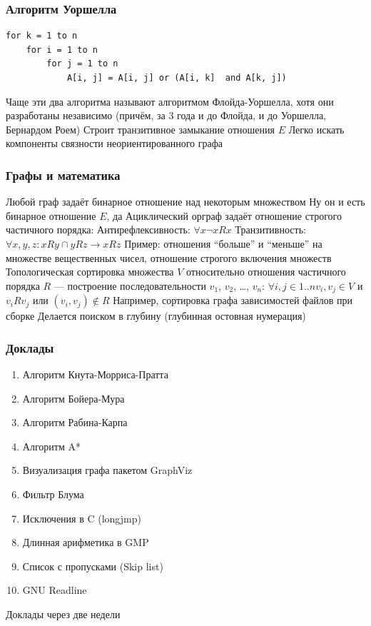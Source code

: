 \documentclass{../../slides-style}
\begin{document}
    \begin{frame}[fragile]
        \frametitle{Алгоритм Уоршелла}
        \begin{footnotesize}
            \begin{verbatim}
for k = 1 to n
    for i = 1 to n
        for j = 1 to n
            A[i, j] = A[i, j] or (A[i, k]  and A[k, j])
            \end{verbatim}
        \end{footnotesize}
        \begin{outline}
            \1 Чаще эти два алгоритма называют алгоритмом Флойда-Уоршелла, хотя они разработаны независимо (причём, за 3 года и до Флойда, и до Уоршелла, Бернардом Роем)
            \1 Строит транзитивное замыкание отношения $E$
                \2 Легко искать компоненты связности неориентированного графа
        \end{outline}
    \end{frame}

    \begin{frame}
        \frametitle{Графы и математика}
        \begin{outline}
            \1 Любой граф задаёт бинарное отношение над некоторым множеством
                \2 Ну он и есть бинарное отношение $E$, да
            \1 Ациклический орграф задаёт отношение строгого частичного порядка:
                \2 Антирефлексивность: $\forall x \neg xRx$
                \2 Транзитивность: $\forall x,y,z: xRy \cap yRz \rightarrow xRz$
                \2 Пример: отношения ``больше'' и ``меньше'' на множестве вещественных чисел, отношение строгого включения множеств
            \1 Топологическая сортировка множества $V$ относительно отношения частичного порядка $R$ --- построение последовательности $v_1$, $v_2$, …, $v_n$: 
            $\forall i,j \in 1..n v_i, v_j \in V$ и $v_iRv_j$ или $(v_i, v_j) \not\in R$
                \2 Например, сортировка графа зависимостей файлов при сборке
                \2 Делается поиском в глубину (глубинная остовная нумерация)
        \end{outline}
    \end{frame}

    \begin{frame}
        \frametitle{Доклады}
        \begin{enumerate}
            \item Алгоритм Кнута-Морриса-Пратта
            \item Алгоритм Бойера-Мура
            \item Алгоритм Рабина-Карпа
            \item Алгоритм A*
            \item Визуализация графа пакетом GraphViz
            \item Фильтр Блума
            \item Исключения в C (longjmp)
            \item Длинная арифметика в GMP
            \item Список с пропусками (Skip list)
            \item GNU Readline
        \end{enumerate}
        Доклады через две недели
    \end{frame}
\end{document}
